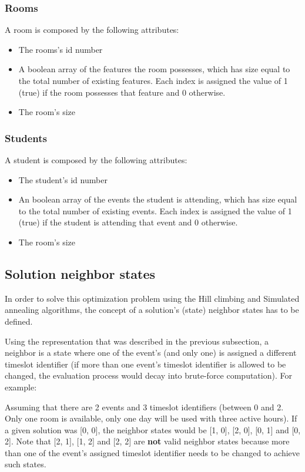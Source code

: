 \documentclass[conference]{IEEEtran}
\begin{document}
\subsubsection{Rooms}

A room is composed by the following attributes:
\begin{itemize}
    \item The rooms's id number
    \item A boolean array of the features the room possesses, which has size equal to the total number of existing features. Each index is assigned the value of 1 (true) if the room possesses that feature and 0 otherwise.
    \item The room's size
\end{itemize}

\subsubsection{Students}

A student is composed by the following attributes:
\begin{itemize}
    \item The student's id number
    \item An boolean array of the events the student is attending, which has size equal to the total number of existing events. Each index is assigned the value of 1 (true) if the student is attending that event and 0 otherwise.
    \item The room's size
\end{itemize}

\subsection{Solution neighbor states}

In order to solve this optimization problem using the Hill climbing and Simulated annealing algorithms, the concept of a solution's (state) neighbor states has to be defined.

Using the representation that was described in the previous subsection, a neighbor is a state where one of the event's (and only one) is assigned a different timeslot identifier (if more than one event's timeslot identifier is allowed to be changed, the evaluation process would decay into brute-force computation). For example:

Assuming that there are 2 events and 3 timeslot identifiers (between 0 and 2. Only one room is available, only one day will be used with three active hours). If a given solution was [0, 0], the neighbor states would be [1, 0], [2, 0], [0, 1] and [0, 2]. Note that [2, 1], [1, 2] and [2, 2] are \textbf{not} valid neighbor states because more than one of the event's assigned timeslot identifier needs to be changed to achieve such states.
\end{document}
